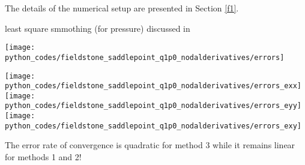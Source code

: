 The details of the numerical setup are presented in Section \ref{f1}.


least square smmothing (for pressure) discussed in \cite{hulb79}



\begin{center}
\texttt{[image: python\_codes/fieldstone\_saddlepoint\_q1p0\_nodalderivatives/errors]}
\end{center}

\begin{center}
\texttt{[image: python\_codes/fieldstone\_saddlepoint\_q1p0\_nodalderivatives/errors\_exx]}
\texttt{[image: python\_codes/fieldstone\_saddlepoint\_q1p0\_nodalderivatives/errors\_eyy]}
\texttt{[image: python\_codes/fieldstone\_saddlepoint\_q1p0\_nodalderivatives/errors\_exy]}
\end{center}
The error rate of convergence is quadratic for method 3 while it remains linear for methods 1 and 2!
